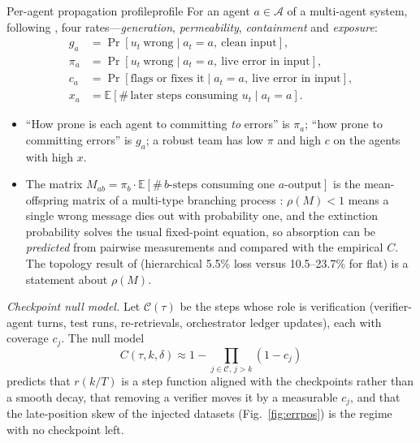 \documentclass[10pt,a4paper]{article}
\begin{document}
\begin{definition}{Per-agent propagation profile}{profile}
For an agent $a\in\mathcal{A}$ of a multi-agent system, following \cite{hiller2004epic}, four rates---\emph{generation}, \emph{permeability}, \emph{containment} and \emph{exposure}:
\begin{align*}
g_a&=\Pr[u_t\ \text{wrong}\mid a_t{=}a,\ \text{clean input}],\\
\pi_a&=\Pr[u_t\ \text{wrong}\mid a_t{=}a,\ \text{live error in input}],\\
c_a&=\Pr[\text{flags or fixes it}\mid a_t{=}a,\ \text{live error in input}],\\
x_a&=\mathbb{E}[\#\,\text{later steps consuming }u_t\mid a_t{=}a].
\end{align*}
\begin{itemize}[leftmargin=1.1em]
\item ``How prone is each agent to committing \emph{to} errors'' is $\pi_a$; ``how prone to committing errors'' is $g_a$; a robust team has low $\pi$ and high $c$ on the agents with high $x$.
\item The matrix $M_{ab}=\pi_b\cdot\mathbb{E}[\#\,b\text{-steps consuming one }a\text{-output}]$ is the mean-offspring matrix of a multi-type branching process \cite{harris1963branching}: $\rho(M)<1$ means a single wrong message dies out with probability one, and the extinction probability solves the usual fixed-point equation, so absorption can be \emph{predicted} from pairwise measurements and compared with the empirical $C$. The topology result of \citet{huang2024resilience} (hierarchical 5.5\% loss versus 10.5--23.7\% for flat) is a statement about $\rho(M)$.
\end{itemize}
\end{definition}

\emph{Checkpoint null model.} Let $\mathcal{C}(\tau)$ be the steps whose role is verification (verifier-agent turns, test runs, re-retrievals, orchestrator ledger updates), each with coverage $c_j$. The null model
\[C(\tau,k,\delta)\approx1-\textstyle\prod_{j\in\mathcal{C},\,j>k}(1-c_j)\]
predicts that $r(k/T)$ is a step function aligned with the checkpoints rather than a smooth decay, that removing a verifier moves it by a measurable $c_j$, and that the late-position skew of the injected datasets (Fig.~\ref{fig:errpos}) is the regime with no checkpoint left.
\end{document}
